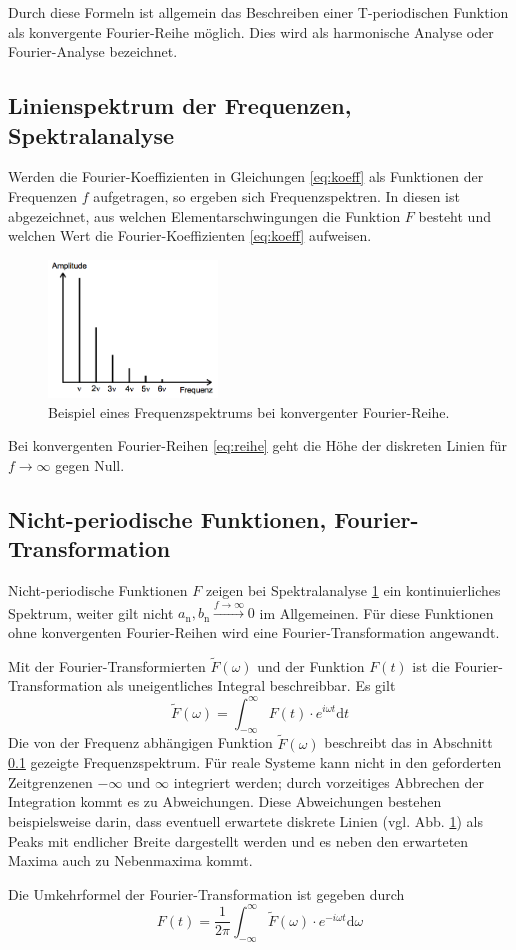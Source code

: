 Durch diese Formeln ist allgemein das Beschreiben einer T-periodischen Funktion als konvergente Fourier-Reihe möglich.
Dies wird als harmonische Analyse oder Fourier-Analyse bezeichnet.
\subsection{Linienspektrum der Frequenzen, Spektralanalyse}
\label{sec:theorie2}
Werden die Fourier-Koeffizienten in Gleichungen \eqref{eq:koeff} als Funktionen der Frequenzen $f$ aufgetragen, so ergeben sich Frequenzspektren. 
In diesen ist abgezeichnet, aus welchen Elementarschwingungen die Funktion $F$ besteht und welchen Wert die Fourier-Koeffizienten \eqref{eq:koeff} aufweisen.
\begin{figure}
	\centering
	\includegraphics[width=0.4\textwidth]{Bilder/Linienspektrum.png}
	\caption{Beispiel eines Frequenzspektrums bei konvergenter Fourier-Reihe. \cite{V351}}
	\label{fig:analyse}
\end{figure}
Bei konvergenten Fourier-Reihen \eqref{eq:reihe} geht die Höhe der diskreten Linien für $f\xrightarrow{}\infty$ gegen Null.

\subsection{Nicht-periodische Funktionen, Fourier-Transformation}
\label{sec:theorie3}
Nicht-periodische Funktionen $F$ zeigen bei Spektralanalyse \ref{fig:analyse} ein kontinuierliches Spektrum, weiter gilt nicht $a_\text{n},b_\text{n}\xrightarrow{f\to\infty}0$ im Allgemeinen.
Für diese Funktionen ohne konvergenten Fourier-Reihen wird eine Fourier-Transformation angewandt.

Mit der Fourier-Transformierten $\tilde{F}(\omega)$ und der Funktion $F(t)$ ist die Fourier-Transformation als uneigentliches Integral beschreibbar.
Es gilt
\begin{equation}
	\tilde{F}(\omega)=\int_{-\infty}^{\infty}F(t)\cdot e^{i\omega t} \mathup{d}t
	\label{eq:fourier}
\end{equation}
Die von der Frequenz abhängigen Funktion $\tilde F(\omega)$ beschreibt das in Abschnitt \ref{sec:theorie2} gezeigte Frequenzspektrum. 
Für reale Systeme kann nicht in den geforderten Zeitgrenzenen $-\infty$ und $\infty$ integriert werden; 
durch vorzeitiges Abbrechen der Integration kommt es zu Abweichungen.
Diese Abweichungen bestehen beispielsweise darin, dass eventuell erwartete diskrete Linien (vgl. Abb. \ref{fig:analyse}) als Peaks mit endlicher Breite dargestellt werden und es neben den erwarteten Maxima auch zu Nebenmaxima kommt.

Die Umkehrformel der Fourier-Transformation ist gegeben durch
\begin{equation}
	F(t)=\frac{1}{2\pi}\int_{-\infty}^{\infty}\tilde{F}(\omega)\cdot e^{-i\omega t} \mathup{d}\omega
	\label{eq:reiruof}
\end{equation}